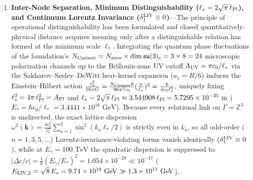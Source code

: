 \documentclass[11pt,a4paper]{article}
\begin{document}
\begin{enumerate}[label=\arabic*.]
\item \textbf{Inter-Node Separation, Minimum Distinguishability ($\ell_* = 2\sqrt{\pi}\,\ell_{\rm Pl}$), and Continuum Lorentz Invariance ($\delta_1^{\rm LIV} \equiv 0$)}---The principle of operational distinguishability has been formulated and closed quantitatively: physical distance acquires meaning only after a distinguishable relation has formed at the minimum scale $\ell_*$. Integrating the quantum phase fluctuations of the foundation's $N_{\rm Casimir} = N_{\rm axes}\times\dim\mathfrak{su}(3)_c = 3\times 8 = 24$ microscopic polarization channels up to the Brillouin-zone UV cutoff $\Lambda_{\rm UV} = \pi c_0/\ell_*$ via the Sakharov--Seeley--DeWitt heat-kernel expansion ($a_1 = R/6$) induces the Einstein--Hilbert action $\frac{c_0^3}{16\pi G} = \frac{N_{\rm Casimir}\hbar}{96\pi^2 c_0}(\frac{\pi}{\ell_*})^2 = \frac{\hbar}{4 c_0\ell_*^2}$, uniquely fixing \textbf{$\ell_*^2 = 4\pi\,\ell_{\rm Pl}^2 = A_{\rm Pl}$} and \textbf{$\ell_* = 2\sqrt{\pi}\,\ell_{\rm Pl} \approx 3.544908\,\ell_{\rm Pl} = 5.7295\times 10^{-35}\text{ m}$} ($E_* = \hbar c_0/\ell_* = 3.4441\times 10^{18}\text{ GeV}$). Because every relational link on $\Gamma = \mathbb{Z}^3$ is undirected, the exact lattice dispersion $\omega^2(\mathbf{k}) = \frac{4 c_0^2}{\ell_*^2}\sum_{a=1}^3\sin^2(k_a\ell_*/2)$ is strictly even in $k_a$, so all odd-order ($n=1, 3, 5, \dots$) Lorentz-invariance-violating terms vanish identically ($\delta_1^{\rm LIV} \equiv 0$), while at $E_\gamma = 100\text{ TeV}$ the quadratic dispersion is suppressed to $|\Delta c/c| = \frac{1}{8}(E_\gamma/E_*)^2 = 1.054\times 10^{-28} \ll 10^{-17}$ ($E_{\rm LIV,2} = \sqrt{8}\,E_* = 9.74\times 10^{18}\text{ GeV} \gg 1.3\times 10^{11}\text{ GeV}$).


\end{enumerate}
\end{document}

